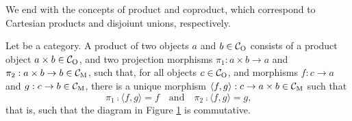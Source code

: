 We end with the concepts of product and coproduct, which correspond to
Cartesian products and disjoiunt unions, respectively.

\begin{definition}
  [Product]


  \label{def:product}


  Let  be a category. A product of two objects $a$ and $b \in
  \mathcal{C}_{\operatorname{O}}$ consists of a product object $a \times b \in \mathcal{C}_{\operatorname{O}}$,
  and two projection morphisms $\pi_{1}: a \times b \to a$ and
  $\pi_{2}: a \times b \to b \in \mathcal{C}_{\operatorname{M}}$, such that, for all objects
  $c \in \mathcal{C}_{\operatorname{O}}$, and morphisms $f: c \to a$ and $g: c \to b \in
  \mathcal{C}_{\operatorname{M}}$, there is a unique morphism $\langle{f,g}\rangle: c \to a
  \times b \in \mathcal{C}_{\operatorname{M}}$ such that
  \begin{equation}
    \label{eq:product}
    \pi_{1} \comp \langle{f,g}\rangle = f
    \quad
    \text{and}
    \quad
    \pi_{2} \comp \langle{f,g}\rangle = g
    \text{,}
  \end{equation}
  that is, such that the diagram in Figure \ref{fig:product} is
  commutative.
  \begin{figure}[htbp]
    \begin{center}
    \end{center}
    \caption{}
    \label{fig:product}
  \end{figure}

\end{definition}

